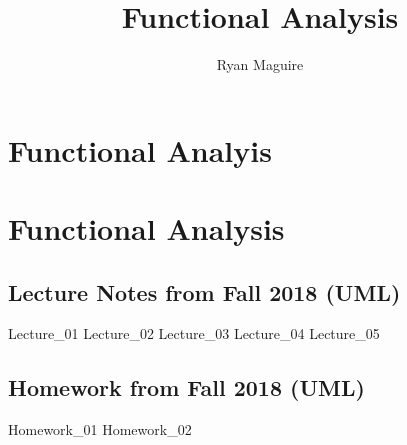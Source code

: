 \documentclass[crop=false,class=book,oneside]{standalone}
\begin{document}
    \newif\ifmathcoursesfunctional
    \ifx\ifmathcourses\undefined
        \title{Functional Analysis}
        \author{Ryan Maguire}
        \date{\vspace{-5ex}}
        \maketitle
        \tableofcontents
        \clearpage
        \chapter*{Functional Analyis}
        \setcounter{chapter}{1}
    \else
        \chapter{Functional Analysis}
    \fi
    \section{Lecture Notes from Fall 2018 (UML)}
        {Lecture_01}
        {Lecture_02}
        {Lecture_03}
        {Lecture_04}
        {Lecture_05}
    \newpage
    \section{Homework from Fall 2018 (UML)}
        {Homework_01}
        {Homework_02}
\end{document}
